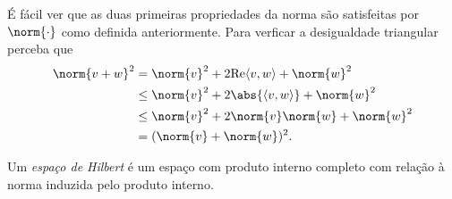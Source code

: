 É fácil ver que as duas primeiras propriedades da norma são satisfeitas por \( \norm{ \cdot } \) como definida anteriormente.
Para verficar a desigualdade triangular perceba que
\begin{align}
    \norm{ v + w }^2
    &= \norm{ v }^2 + 2 \Re \dotprod{v, w} + \norm{ w }^2 \\
    &\leq \norm{ v }^2 + 2 \abs{ \dotprod{v, w} } + \norm{ w }^2 \\
    &\leq \norm{ v }^2 + 2 \norm{ v } \norm{ w } + \norm{ w }^2 \\
    &= ( \norm{ v } + \norm{ w } )^2
.\end{align}

\begin{defn}
    Um \emph{espaço de Hilbert} é um espaço com produto interno completo com relação à norma induzida pelo produto interno.
\end{defn}